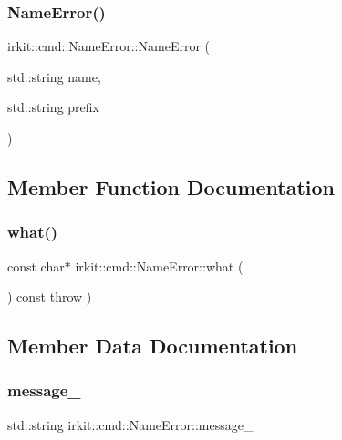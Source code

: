 \subsubsection{\texorpdfstring{Name\+Error()}{NameError()}}
{\footnotesize\ttfamily irkit\+::cmd\+::\+Name\+Error\+::\+Name\+Error (\begin{DoxyParamCaption}\item[{std\+::string}]{name,  }\item[{std\+::string}]{prefix }\end{DoxyParamCaption})\hspace{0.3cm}{\ttfamily [inline]}}



\subsection{Member Function Documentation}
\mbox{\label{classirkit_1_1cmd_1_1NameError_a623fcf339a7888848347f8afbeb35742}} 
\subsubsection{\texorpdfstring{what()}{what()}}
{\footnotesize\ttfamily const char$\ast$ irkit\+::cmd\+::\+Name\+Error\+::what (\begin{DoxyParamCaption}{ }\end{DoxyParamCaption}) const throw  ) \hspace{0.3cm}{\ttfamily [inline]}}



\subsection{Member Data Documentation}
\mbox{\label{classirkit_1_1cmd_1_1NameError_a619a611ece431af4c1100e97ec3daff4}} 
\subsubsection{\texorpdfstring{message\+\_\+}{message\_}}
{\footnotesize\ttfamily std\+::string irkit\+::cmd\+::\+Name\+Error\+::message\+\_\+\hspace{0.3cm}{\ttfamily [protected]}}

